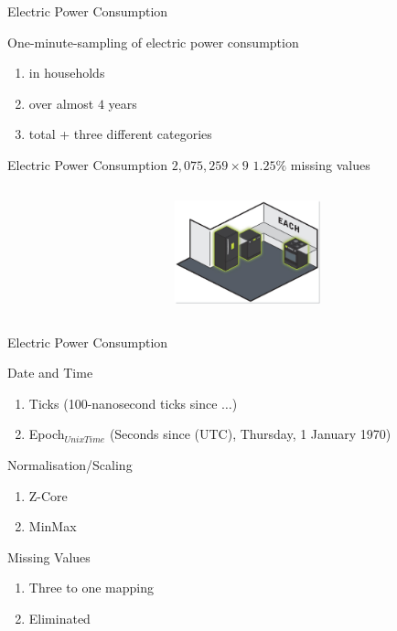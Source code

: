 \begin{frame}{Electric Power Consumption}

\begin{tcolorbox}[colback=white!5,colframe=yellow!40!black,title=Charactrestics]
\bi
\mi One-minute-sampling of electric power consumption  
\begin{enumerate}
    \item in households
    \item over almost $4$ years
    \item total + three different categories 

  \end{enumerate}
\mi Electric Power Consumption
\mi $2,075,259\times9$
\mi $1.25\%$ missing values
\ei
\begin{columns}[t] %
     \begin{column}[T]{7cm} %
     
     \end{column}
     \begin{column}[T]{5cm} %
          \includegraphics[height=3cm]{fig/each.jpg}
     \end{column}
     \end{columns}
\end{tcolorbox}




\end{frame}

\begin{frame}{Electric Power Consumption}

\begin{tcolorbox}[colback=green!5,colframe=green!40!black,title=Preprocessing]

\bi
\mi Date and Time
\begin{enumerate}
    \item Ticks {\tiny (100-nanosecond ticks since $\ldots$)}
    \item Epoch$_{Unix Time}$ {\tiny (Seconds since (UTC), Thursday, 1
    January 1970) }
  \end{enumerate}
\mi Normalisation/Scaling
\begin{enumerate}
    \item Z-Core 
    \item MinMax 
  \end{enumerate}
  
  \mi Missing Values
\begin{enumerate}
    \item Three to one mapping 
    \item Eliminated
  \end{enumerate}
\ei


\end{tcolorbox}
\end{frame}

